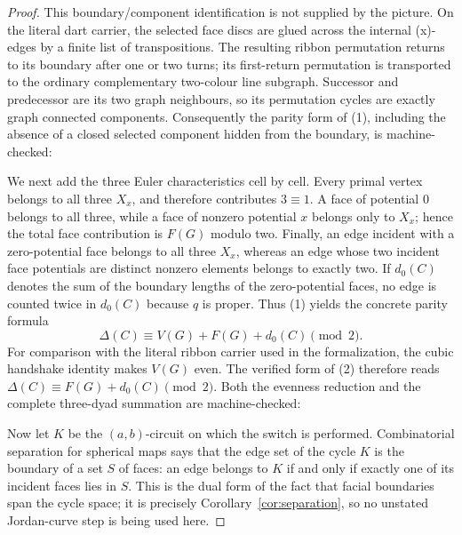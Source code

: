\begin{proof}
This boundary/component identification is not supplied by the picture.  On
the literal dart carrier, the selected face discs are glued across the
internal (x)-edges by a finite list of transpositions.  The resulting ribbon
permutation returns to its boundary after one or two turns; its first-return
permutation is transported to the ordinary complementary two-colour line
subgraph.  Successor and predecessor are its two graph neighbours, so its
permutation cycles are exactly graph connected components.  Consequently the
parity form of (1), including the absence of a closed selected component
hidden from the boundary, is machine-checked:

We next add the three Euler characteristics cell by cell.  Every primal
vertex belongs to all three $X_x$, and therefore contributes $3\equiv1$.
A face of potential $0$ belongs to all three, while a face of nonzero
potential $x$ belongs only to $X_x$; hence the total face contribution is
$F(G)$ modulo two.  Finally, an edge incident with a zero-potential face
belongs to all three $X_x$, whereas an edge whose two incident face
potentials are distinct nonzero elements belongs to exactly two.  If
$d_0(C)$ denotes the sum of the boundary lengths of the zero-potential
faces, no edge is counted twice in $d_0(C)$ because $q$ is proper.  Thus
(1) yields the concrete parity formula
\[
                  \Delta(C)\equiv
                  V(G)+F(G)+d_0(C)\pmod2.       \tag{2}
\]
For comparison with the literal ribbon carrier used in the formalization,
the cubic handshake identity makes $V(G)$ even.  The verified form of (2)
therefore reads
\(\Delta(C)\equiv F(G)+d_0(C)\pmod2\).  Both the evenness reduction and the
complete three-dyad summation are machine-checked:

Now let $K$ be the $(a,b)$-circuit on which the switch is performed.
Combinatorial separation for spherical maps says that the edge set of the
cycle $K$ is the boundary of a set $S$ of faces: an edge belongs to $K$ if
and only if exactly one of its incident faces lies in $S$.  This is the
dual form of the fact that facial boundaries span the cycle space; it is
precisely Corollary~\ref{cor:separation}, so no unstated Jordan-curve step is
being used here.


\end{proof}
